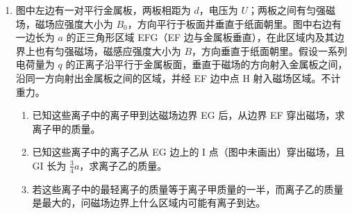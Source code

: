 \documentclass[\gkver]{gaokaozhenti}
\begin{document}
\begin{enumerate}
{$m_{A}gH=\frac{1}{2}m_{A}v_{0}^{2}$ ①

设小球 A 与 B 碰撞后的速度分别为 $v_{1}$ 和 $v_{2}$，以竖直向上方向为正，由动量守恒有

$m_{A}v_{0}+m_{B}(-v_{0})=m_{A}v_{1}+m_{B}v_{2}$ ②

由于两球碰撞过程中能量守恒，故

$\frac{1}{2}m_{A}v_{0}^{2}+\frac{1}{2}m_{B}v_{0}^{2}=\frac{1}{2}m_{A}v_{1}^{2}+\frac{1}{2}m_{B}v_{2}^{2}$ ③

联立②③式得

$v_{2}=\frac{3m_{A}-m_{B}}{m_{A}+m_{B}}v_{0}$ ④

设小球 B 能上升的最大高度为 $h$，由运动学公式有

$h=\frac{v_{2}^{2}}{2g}$ ⑤

由①④⑤式得

$h=\left(\frac{3m_{A}-m_{B}}{m_{A}+m_{B}}\right)^{2}H$ ⑥
}

\item
图中左边有一对平行金属板，两板相距为 $d$，电压为 $U$；两板之间有匀强磁场，磁场应强度大小为 $B_{0}$，方向平行于板面并垂直于纸面朝里。图中右边有一边长为 $a$ 的正三角形区域 EFG（EF 边与金属板垂直），在此区域内及其边界上也有匀强磁场，磁感应强度大小为 $B$，方向垂直于纸面朝里。假设一系列电荷量为 $q$ 的正离子沿平行于金属板面，垂直于磁场的方向射入金属板之间，沿同一方向射出金属板之间的区域，并经 EF 边中点 H 射入磁场区域。不计重力。

\begin{enumerate}
	\item
	已知这些离子中的离子甲到达磁场边界 EG 后，从边界 EF 穿出磁场，求离子甲的质量。
	\item
	已知这些离子中的离子乙从 EG 边上的 I 点（图中未画出）穿出磁场，且 GI 长为 $\frac{3}{4}a$，求离子乙的质量。
	\item
	若这些离子中的最轻离子的质量等于离子甲质量的一半，而离子乙的质量是最大的，问磁场边界上什么区域内可能有离子到达。
\end{enumerate}
\end{enumerate}
\end{document}
